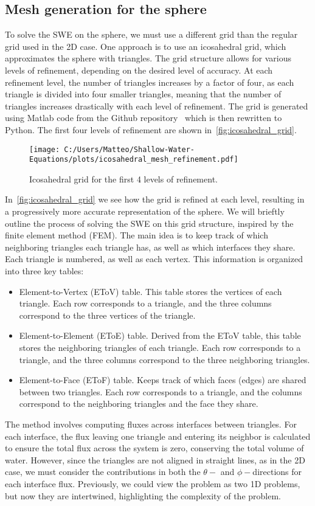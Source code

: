 \subsection*{Mesh generation for the sphere}
To solve the SWE on the sphere, we must use a different grid than the regular grid used in the 2D case.
One approach is to use an icosahedral grid, which approximates the sphere with triangles.
The grid structure allows for various levels of refinement, depending on the desired level of accuracy.
At each refinement level, the number of triangles increases by a factor of four, as each triangle is divided into four smaller triangles, meaning that the number of triangles increases drastically with each level of refinement.
The grid is generated using Matlab code from the Github repository~\cite{sphere_mesh_triangles} which is then rewritten to Python.
The first four levels of refinement are shown in~\autoref{fig:icosahedral_grid}.
\begin{figure}[H]
    \centering
    \texttt{[image: C:/Users/Matteo/Shallow-Water-Equations/plots/icosahedral\_mesh\_refinement.pdf]}
    \caption{Icosahedral grid for the first 4 levels of refinement.}\label{fig:icosahedral_grid}
\end{figure}
In~\autoref{fig:icosahedral_grid} we see how the grid is refined at each level, resulting in a progressively more accurate representation of the sphere.
We will brieftly outline the process of solving the SWE on this grid structure, inspired by the finite element method (FEM).
The main idea is to keep track of which neighboring triangles each triangle has, as well as which interfaces they share.
Each triangle is numbered, as well as each vertex.
This information is organized into three key tables:
\begin{itemize}
    \item Element-to-Vertex (EToV) table. This table stores the vertices of each triangle.
    Each row corresponds to a triangle, and the three columns correspond to the three vertices of the triangle.
    \item Element-to-Element (EToE) table. Derived from the EToV table, this table stores the neighboring triangles of each triangle.
    Each row corresponds to a triangle, and the three columns correspond to the three neighboring triangles. 
    \item Element-to-Face (EToF) table. Keeps track of which faces (edges) are shared between two triangles.
    Each row corresponds to a triangle, and the columns correspond to the neighboring triangles and the face they share.
\end{itemize}
The method involves computing fluxes across interfaces between triangles.
For each interface, the flux leaving one triangle and entering its neighbor is calculated to ensure the total flux across the system is zero, conserving the total volume of water.
However, since the triangles are not aligned in straight lines, as in the 2D case, we must consider the contributions in both the $\theta-$ and $\phi-$directions for each interface flux.
Previously, we could view the problem as two 1D problems, but now they are intertwined, highlighting the complexity of the problem.

